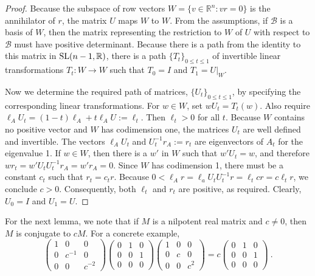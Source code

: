 \documentclass{amsart}
\theoremstyle{definition}
\theoremstyle{remark}
\numberwithin{equation}{section}
\begin{document}
{{\begin{proof}
Because the subspace of row vectors 
$W=\{v\in \mathbb R^n: vr=0\}$ is the annihilator of $r$, 
the matrix $U$ maps $W$ to $W$. 
From the assumptions, if $\mathcal B$ is a basis of $W$, then 
the matrix representing the restriction to $W$ of $U$ with respect to 
$\mathcal B$ must have positive determinant. Because there is a path 
from the identity to this matrix in 
$\textnormal{SL}(n-1,\mathbb R)$, 
 there is a path $\{T_t\}_{0\leq t\leq 1}$ of invertible  
linear transformations
$T_t:W\to W $
such that $T_0=I$ and 
$T_1=U|_W$. 

Now we determine the required path 
of matrices, $\{U_{t}\}_{0\leq t\leq 1}$,
by specifying the corresponding linear transformations. 
For $w\in W$, set $wU_t=T_t(w)$. 
Also require 
$\ell_AU_t =(1-t)\ell_A+t\ell_AU:=\ell_t$. 
Then $\ell_t>0$ for all $t$. Because $W$ contains no positive vector 
and $W$ has codimension one, 
the matrices $U_t$ are well defined and invertible. 
The vectors 
$\ell_AU_t $ and $U_t^{-1}r_A:=r_t$ are  eigenvectors of $A_t$ 
for the eigenvalue 1. If $w\in W$, then there is a $w'$ in 
$W$ such that $w'U_t=w$, and therefore 
$wr_t= w' U_tU_t^{-1}r_A=w'r_A=0$. Since $W$ has codimension 1, 
there must be a constant $c_t$ such that $r_t=c_tr$. 
Because $0<\ell_Ar = \ell_aU_tU_t^{-1}r=\ell_tcr=c\ell_tr $, we 
conclude $c>0$.  Consequently, both $\ell_t$ and $r_t$ are positive, as required. 
Clearly, 
 $U_0=I$ 
and $U_1=U$.
\end{proof} 



For the next lemma, we note that if $M$ is a 
 nilpotent real matrix and $c\neq 0$, then 
$M$ is conjugate to $cM$. For a concrete example, 
\[
\begin{pmatrix} 1 & 0 & 0 \\ 0 & c^{-1} & 0\\ 0 & 0 & c^{-2} 
\end{pmatrix} 
\begin{pmatrix} 0 & 1 & 0 \\ 0 & 0 & 1\\ 0 & 0 & 0
\end{pmatrix} 
\begin{pmatrix} 1 & 0 & 0 \\ 0 & c & 0\\ 0 & 0 & c^2 
\end{pmatrix} 
= c \begin{pmatrix} 0 & 1 & 0 \\ 0 & 0 & 1\\ 0 & 0 & 0
\end{pmatrix}  \ . 
\] 

}}
\end{document}
